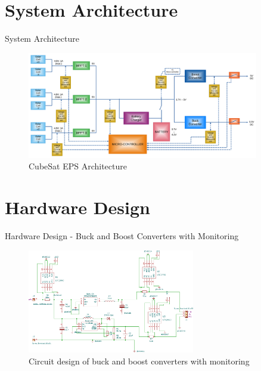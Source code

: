 \documentclass[aspectratio=169]{beamer}
\begin{document}
		
		
		\section{System Architecture}
		\begin{frame}{System Architecture}
			\begin{figure}[h]
				\centering
				\includegraphics[width=0.9\textwidth]{diag1.pdf}
				\caption{CubeSat EPS Architecture}
				\label{fig:mesh1}
			\end{figure}
			
			
		\end{frame}
		
		\section{Hardware Design}
		\begin{frame}{Hardware Design - Buck and Boost Converters with Monitoring }
			\begin{figure}[h]
				\centering
				\includegraphics[width=0.65\textwidth]{diag/1.pdf}
				\caption{Circuit design of buck and boost converters with monitoring}
				\label{fig:bubo}
			\end{figure}
		\end{frame}
		
\end{document}
